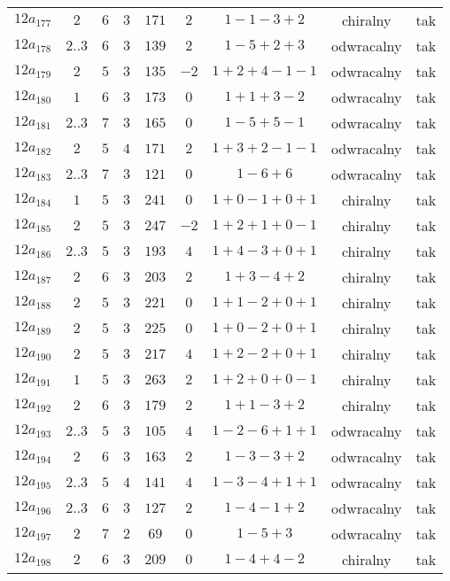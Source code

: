 \begin{longtable}{ccccccccc}
$12a_{177}$ & $2$ & $6$ & $3$ & $171$ & $2$ & $1-1-3+2$ & chiralny & tak \\
$12a_{178}$ & $2..3$ & $6$ & $3$ & $139$ & $2$ & $1-5+2+3$ & odwracalny & tak \\
$12a_{179}$ & $2$ & $5$ & $3$ & $135$ & $-2$ & $1+2+4-1-1$ & odwracalny & tak \\
$12a_{180}$ & $1$ & $6$ & $3$ & $173$ & $0$ & $1+1+3-2$ & odwracalny & tak \\
$12a_{181}$ & $2..3$ & $7$ & $3$ & $165$ & $0$ & $1-5+5-1$ & odwracalny & tak \\
$12a_{182}$ & $2$ & $5$ & $4$ & $171$ & $2$ & $1+3+2-1-1$ & odwracalny & tak \\
$12a_{183}$ & $2..3$ & $7$ & $3$ & $121$ & $0$ & $1-6+6$ & odwracalny & tak \\
$12a_{184}$ & $1$ & $5$ & $3$ & $241$ & $0$ & $1+0-1+0+1$ & chiralny & tak \\
$12a_{185}$ & $2$ & $5$ & $3$ & $247$ & $-2$ & $1+2+1+0-1$ & chiralny & tak \\
$12a_{186}$ & $2..3$ & $5$ & $3$ & $193$ & $4$ & $1+4-3+0+1$ & chiralny & tak \\
$12a_{187}$ & $2$ & $6$ & $3$ & $203$ & $2$ & $1+3-4+2$ & chiralny & tak \\
$12a_{188}$ & $2$ & $5$ & $3$ & $221$ & $0$ & $1+1-2+0+1$ & chiralny & tak \\
$12a_{189}$ & $2$ & $5$ & $3$ & $225$ & $0$ & $1+0-2+0+1$ & chiralny & tak \\
$12a_{190}$ & $2$ & $5$ & $3$ & $217$ & $4$ & $1+2-2+0+1$ & chiralny & tak \\
$12a_{191}$ & $1$ & $5$ & $3$ & $263$ & $2$ & $1+2+0+0-1$ & chiralny & tak \\
$12a_{192}$ & $2$ & $6$ & $3$ & $179$ & $2$ & $1+1-3+2$ & chiralny & tak \\
$12a_{193}$ & $2..3$ & $5$ & $3$ & $105$ & $4$ & $1-2-6+1+1$ & odwracalny & tak \\
$12a_{194}$ & $2$ & $6$ & $3$ & $163$ & $2$ & $1-3-3+2$ & odwracalny & tak \\
$12a_{195}$ & $2..3$ & $5$ & $4$ & $141$ & $4$ & $1-3-4+1+1$ & odwracalny & tak \\
$12a_{196}$ & $2..3$ & $6$ & $3$ & $127$ & $2$ & $1-4-1+2$ & odwracalny & tak \\
$12a_{197}$ & $2$ & $7$ & $2$ & $69$ & $0$ & $1-5+3$ & odwracalny & tak \\
$12a_{198}$ & $2$ & $6$ & $3$ & $209$ & $0$ & $1-4+4-2$ & chiralny & tak \\

\end{longtable}
